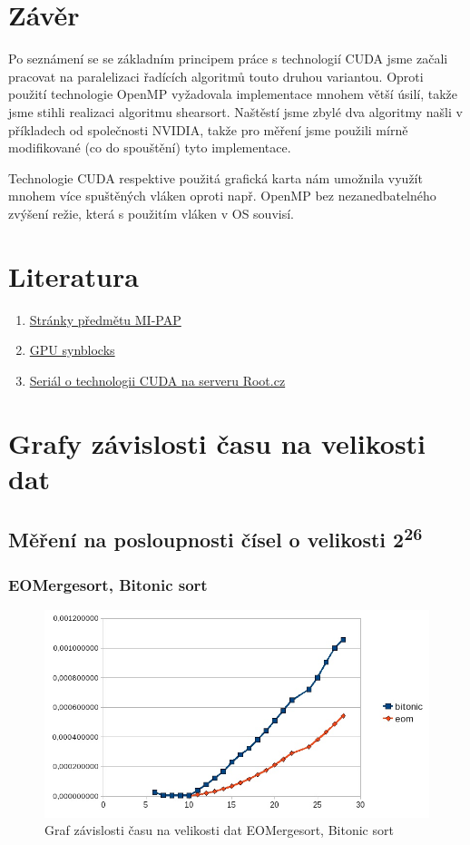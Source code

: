 \documentclass[12pt]{article}
\begin{document}
\section{Závěr}
Po seznámení se se základním principem práce s technologií CUDA jsme začali pracovat na paralelizaci řadících algoritmů touto druhou variantou. Oproti použití technologie OpenMP vyžadovala implementace mnohem větší úsilí, takže jsme stihli realizaci algoritmu shearsort. Naštěstí jsme zbylé dva algoritmy našli v příkladech od společnosti NVIDIA, takže pro měření jsme použili mírně modifikované (co do spouštění) tyto implementace.

Technologie CUDA respektive použitá grafická karta nám umožnila využít mnohem více spuštěných vláken oproti např. OpenMP bez nezanedbatelného zvýšení režie, která s použitím vláken v OS souvisí. 
\section{Literatura}
\begin{enumerate}
\item \href{https://edux.fit.cvut.cz/courses/MI-PAP}{Stránky předmětu MI-PAP}
\item \href{http://aggregate.org/MAGIC/#GPU SyncBlocks}{\label{cud:synblocks}GPU synblocks}
\item \href{http://www.root.cz/serialy/uvod-do-technologie-cuda/}{Seriál o technologii CUDA na serveru Root.cz}
\end{enumerate}

\appendix
\section{Grafy závislosti času na velikosti dat}

\subsection{Měření na posloupnosti čísel o velikosti 2\textsuperscript{26}}
\subsubsection{EOMergesort, Bitonic sort}
\begin{figure}[H]
\begin{center}
\includegraphics[width=14cm]{cuda-eom-bit.jpg}
\caption{Graf závislosti času na velikosti dat EOMergesort, Bitonic sort}
\label{fig:cuda-eom-bit}
\end{center}
\end{figure}
\end{document}
